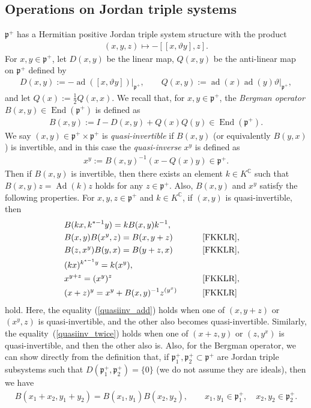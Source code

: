 \documentclass[11pt]{article}
\numberwithin{equation}{section}
\newcommand{\BC}{\mathbb{C}}
\newcommand{\fp}{\mathfrak{p}}
\newcommand{\End}{\operatorname{End}}
\begin{document}
\subsection{Operations on Jordan triple systems}
$\fp^+$ has a Hermitian positive Jordan triple system structure with the product
\begin{gather*} (x,y,z)\mapsto -[[x,\vartheta y],z]. \end{gather*}
For $x,y\in\fp^+$, let $D(x,y)$ be the linear map, $Q(x,y)$ be the anti-linear map on $\fp^+$ defined by
\begin{gather*} D(x,y):=-\operatorname{ad}([x,\vartheta y])\bigr|_{\fp^+},\qquad Q(x,y):=\operatorname{ad}(x)\operatorname{ad}(y)\vartheta\bigr|_{\fp^+}, \end{gather*}
and let $Q(x):=\frac{1}{2}Q(x,x)$.
We recall that, for $x,y\in\fp^+$, the \textit{Bergman operator} $B(x,y)\in\End(\fp^+)$ is defined as
\begin{gather*} B(x,y):=I-D(x,y)+Q(x)Q(y)\in\End(\fp^+). \end{gather*}
We say $(x,y)\in\fp^+\times\fp^+$ is \textit{quasi-invertible} if $B(x,y)$ (or equivalently $B(y,x)$) is invertible,
and in this case the \textit{quasi-inverse} $x^y$ is defined as
\begin{gather*} x^y:=B(x,y)^{-1} \left(x-Q(x)y\right)\in\fp^+. \end{gather*}
Then if $B(x,y)$ is invertible, then there exists an element $k\in K^\BC$ such that $B(x,y)z=\operatorname{Ad}(k)z$ holds for any $z\in\fp^+$.
Also, $B(x,y)$ and $x^y$ satisfy the following properties. For $x,y,z\in\fp^+$ and $k\in K^\BC$, if $(x,y)$ is quasi-invertible, then
\begin{alignat}{3}
& B(kx,k^{*-1}y) =kB(x,y)k^{-1}, &&\label{Bergman_k}\\
& B(x,y)B(x^y,z) =B(x,y+z) \qquad & & \text{\cite[Part V, Proposition III.3.1, (J6.4)]{FKKLR}},&\label{Bergman_left}\\
& B(z,x^y)B(y,x) =B(y+z,x) \qquad & & \text{\cite[Part V, Proposition III.3.1, (J6.4$'$)]{FKKLR}},&\label{Bergman_right}\\
& (kx)^{k^{*-1}y} =k(x^y), &&& \label{quasiinv_k}\\
& x^{y+z} =(x^y)^z \qquad & & \text{\cite[Part V, Theorem III.5.1(i)]{FKKLR}},& \label{quasiinv_add}\\
&(x+z)^y=x^y+B(x,y)^{-1}z^{(y^x)} \qquad & & \text{\cite[Part V, Theorem III.5.1(ii)]{FKKLR}}& \label{quasiinv_twice}
\end{alignat}
hold. Here, the equality (\ref{quasiinv_add}) holds when one of $(x,y+z)$ or $(x^y,z)$ is quasi-invertible,
and the other also becomes quasi-invertible. Similarly, the equality~(\ref{quasiinv_twice}) holds when one of $(x+z,y)$ or $(z,y^x)$ is
quasi-invertible, and then the other also is. Also, for the Bergman operator, we can show directly from the definition that,
if $\fp^+_1,\fp^+_2\subset \fp^+$ are Jordan triple subsystems such that $D(\fp^+_1,\fp^+_2)=\{0\}$ (we do not assume they are ideals),
then we have
\begin{gather}\label{Bergman_decomp}
B(x_1+x_2,y_1+y_2)=B(x_1,y_1)B(x_2,y_2), \qquad x_1,y_1\in\fp^+_1, \quad x_2,y_2\in\fp^+_2.
\end{gather}
\end{document}
